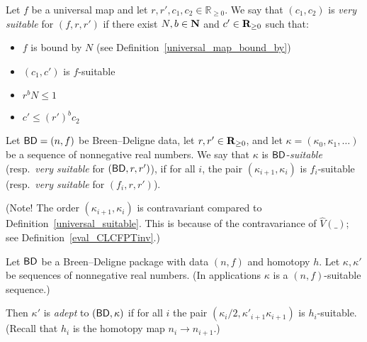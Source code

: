 \begin{definition}
  \label{very_suitable}
  \leanok
  Let $f$ be a universal map and let $r, r', c_1, c_2 \in \mathbb R_{\ge 0}$.
  We say that $(c_1, c_2)$ is \emph{very suitable}
  for $(f, r, r')$
  if there exist $N, b \in \mathbf{N}$ and $c' \in \mathbf{R}_{\ge 0}$ such that:
  \begin{itemize}
    \item $f$ is bound by $N$ (see Definition~\ref{universal_map_bound_by})
    \item $(c_1, c')$ is $f$-suitable
    \item $r ^ b N ≤ 1$
    \item $c' ≤ (r') ^ b c_2$
  \end{itemize}
\end{definition}

\begin{definition}
  \label{BD_suitable}
  \label{BD_very_suitable}
  \leanok
  Let $\mathsf{BD} = (n, f)$ be Breen--Deligne data,
  let $r, r' \in \mathbf{R}_{\ge 0}$,
  and let $\kappa = (\kappa_0, \kappa_1, \dots)$ be a sequence of nonnegative real numbers.
  We say that $\kappa$ is $\mathsf{BD}$-\emph{suitable}
  (resp.\ \emph{very suitable} for $(\mathsf{BD}, r, r')$),
  if for all $i$, the pair $(\kappa_{i+1}, \kappa_i)$ is $f_i$-suitable
  (resp.\ \emph{very suitable} for $(f_i, r, r')$).

  (Note! The order $(\kappa_{i+1}, \kappa_i)$ is contravariant
  compared to Definition~\ref{universal_suitable}.
  This is because of the contravariance of $\hat V(\_)$;
  see Definition~\ref{eval_CLCFPTinv}.)
\end{definition}

\begin{definition}
  \label{adept}
  \leanok
  Let $\mathsf{BD}$ be a Breen--Deligne package with data $(n,f)$ and homotopy $h$.
  Let $\kappa, \kappa'$ be sequences of nonnegative real numbers.
  (In applications $\kappa$ is a $(n,f)$-suitable sequence.)

  Then $\kappa'$ is \emph{adept} to $(\mathsf{BD}, \kappa)$ if
  for all $i$ the pair $(\kappa_i / 2, \kappa'_{i+1} \kappa_{i+1})$
  is $h_i$-suitable.
  (Recall that $h_i$ is the homotopy map $n_i \to n_{i+1}$.)
\end{definition}

